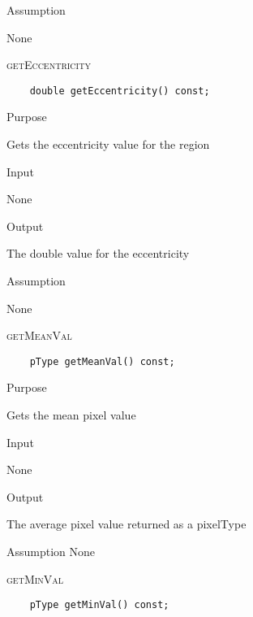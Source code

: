 \documentclass[pdftex, 11pt]{article}
\begin{document}
\begin{description}
\begin{description}
			\item{Assumption}

				None

		\end{description}

	\item{\textsc{getEccentricity}}
		\begin{description}
\begin{lstlisting}
	double getEccentricity() const;
\end{lstlisting}

			\item{Purpose}

				Gets the eccentricity value for the region

			\item{Input}

				None

			\item{Output}

				The double value for the eccentricity

			\item{Assumption}

				None

		\end{description}

	\item{\textsc{getMeanVal}}
		\begin{description}
\begin{lstlisting}
	pType getMeanVal() const;
\end{lstlisting}

			\item{Purpose}

				Gets the mean pixel value

			\item{Input}

				None

			\item{Output}

				The average pixel value returned as a pixelType



			\item{Assumption}
				None

		\end{description}

	\item{\textsc{getMinVal}}
		\begin{description}
\begin{lstlisting}
	pType getMinVal() const;
\end{lstlisting}


\end{description}
\end{description}
\end{document}
